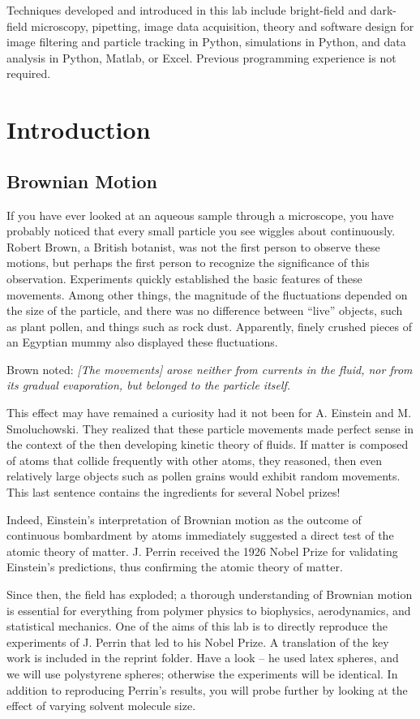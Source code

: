 \documentclass{../lab}
\begin{document}
Techniques developed and introduced in this lab include bright-field and dark-field microscopy, pipetting, image data acquisition, theory and software design for image filtering and particle tracking in Python, simulations in Python, and data analysis in Python, Matlab, or Excel. Previous programming experience is not required.

\section{Introduction}

\subsection{Brownian Motion}

If you have ever looked at an aqueous sample through a microscope, you have probably noticed that every small particle you see wiggles about continuously. Robert Brown, a British botanist, was not the first person to observe these motions, but perhaps the first person to recognize the significance of this observation. Experiments quickly established the basic features of these movements. Among other things, the magnitude of the fluctuations depended on the size of the particle, and there was no difference between ``live'' objects, such as plant pollen, and things such as rock dust. Apparently, finely crushed pieces of an Egyptian mummy also displayed these fluctuations.

Brown noted: \emph{[The movements] arose neither from currents in the fluid, nor from its gradual evaporation, but belonged to the particle itself.}

This effect may have remained a curiosity had it not been for A. Einstein and M. Smoluchowski. They realized that these particle movements made perfect sense in the context of the then developing kinetic theory of fluids. If matter is composed of atoms that collide frequently with other atoms, they reasoned, then even relatively large objects such as pollen grains would exhibit random movements. This last sentence contains the ingredients for several Nobel prizes!

Indeed, Einstein's interpretation of Brownian motion as the outcome of continuous bombardment by atoms immediately suggested a direct test of the atomic theory of matter. J. Perrin received the 1926 Nobel Prize for validating Einstein's predictions, thus confirming the atomic theory of matter.

Since then, the field has exploded; a thorough understanding of Brownian motion is essential for everything from polymer physics to biophysics, aerodynamics, and statistical mechanics. One of the aims of this lab is to directly reproduce the experiments of J. Perrin that led to his Nobel Prize. A translation of the key work is included in the reprint folder. Have a look -- he used latex spheres, and we will use polystyrene spheres; otherwise the experiments will be identical. In addition to reproducing Perrin's results, you will probe further by looking at the effect of varying solvent molecule size.
\end{document}

